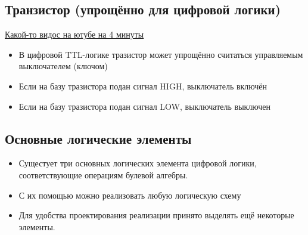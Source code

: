 \documentclass{article}
\theoremstyle{problemstyle}
\theoremstyle{ans}
\begin{document}
\subsection{Транзистор (упрощённо для цифровой логики)}
\href{https://www.youtube.com/watch?v=X99j9CVvf1w}{Какой-то видос на ютубе на 4 минуты} 
\begin{itemize}
    \item В цифровой TTL-логике тразистор может упрощённо считаться управляемым выключателем (ключом)
    \item Если на базу тразистора подан сигнал HIGH, выключатель включён
    \item Если на базу тразистора подан сигнал LOW, выключатель выключен
\end{itemize}

\subsection{Основные логические элементы}
\begin{itemize}
    \item Сущестует три основных логических элемента цифровой логики, соответствующие операциям булевой алгебры.
    \item С их помощью можно реализовать любую логическую схему
    \item Для удобства проектирования реализации принято выделять ещё некоторые элементы.
\end{itemize}
\end{document}
